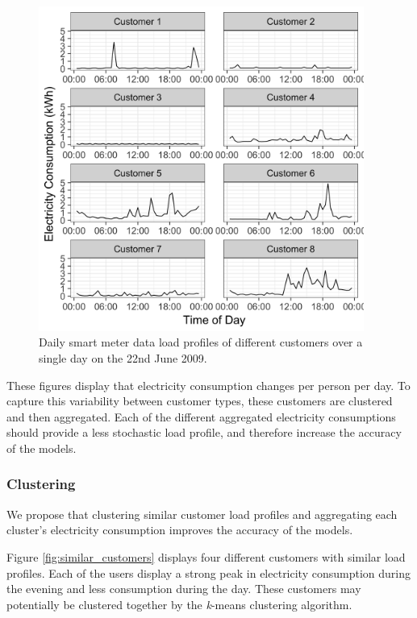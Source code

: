 \begin{figure}
	\centering
	\includegraphics[width=0.95\textwidth]{Chapter5/figures/short-term-forecasting/Rplot02.png}
	\caption{Daily smart meter data load profiles of different customers over a single day on the 22nd June 2009.}
	\label{fig:multiple_users}
\end{figure}

These figures display that electricity consumption changes per person per day. To capture this variability between customer types, these customers are clustered and then aggregated. Each of the different aggregated electricity consumptions should provide a less stochastic load profile, and therefore increase the accuracy of the models.

\subsubsection{Clustering}

We propose that clustering similar customer load profiles and aggregating each cluster's electricity consumption improves the accuracy of the models. 

Figure \ref{fig:similar_customers} displays four different customers with similar load profiles. Each of the users display a strong peak in electricity consumption during the evening and less consumption during the day. These customers may potentially be clustered together by the \textit{k}-means clustering algorithm.

